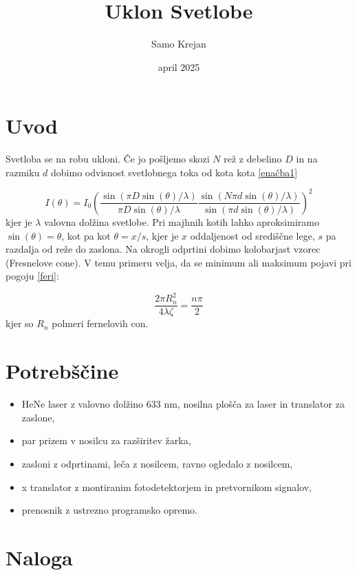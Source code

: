 \documentclass[12pt]{article}
\title{\textbf{Uklon Svetlobe}}
\author{Samo Krejan}
\date{april 2025}
\begin{document}
\maketitle

\section{Uvod}

Svetloba se na robu ukloni. Če jo pošljemo skozi $N$ rež z debelino $D$ in na razmiku $d$ dobimo odvisnost svetlobnega toka od kota kota \ref{enačba1}

\begin{equation}
    I(\theta) = I_0 \left( \frac{\sin(\pi D \sin(\theta)/\lambda)}{\pi D \sin(\theta)/\lambda}\frac{\sin(N\pi d \sin(\theta)/\lambda)}{\sin(\pi d \sin(\theta)/\lambda)} \right)^2
    \label{enačba1}
\end{equation}
kjer je $\lambda$ valovna dolžina svetlobe. Pri majhnih kotih lahko aproksimiramo $\sin(\theta) = \theta$, kot pa kot $\theta = x/s$, kjer je $x$ oddaljenost od središčne lege, $s$ pa razdalja od reže do zaslona. Na okrogli odprtini dobimo kolobarjast vzorec (Fresnelove cone). V temu primeru velja, da se minimum ali maksimum pojavi pri pogoju \ref{feri}:

\begin{equation}
    \frac{2\pi R_n^2}{4\lambda\zeta}=\frac{n\pi}{2}
    \label{feri}
\end{equation}
kjer so $R_n$ polmeri fernelovih con.


\section{Potrebščine}
\begin{itemize}
    \item HeNe laser z valovno dolžino 633 nm, nosilna plošča za laser in translator za zaslone,
    \item par prizem v nosilcu za razširitev žarka,
    \item zasloni z odprtinami, leča z nosilcem, ravno ogledalo z nosilcem,
    \item x translator z montiranim fotodetektorjem in pretvornikom signalov,
    \item prenosnik z ustrezno programsko opremo.
\end{itemize}


\section{Naloga}
\end{document}
